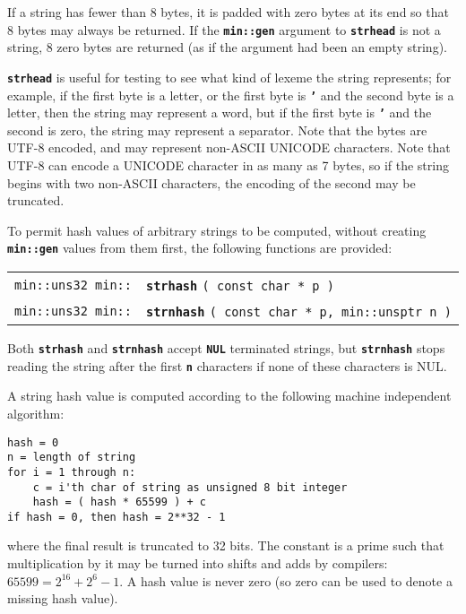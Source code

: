 \documentclass[12pt]{article}
\makeatletter
\newcommand{\TT}[1]{{\tt \bfseries #1}}
\newcommand{\ttindex}[1]{\index{#1@{\tt #1}}}
\newenvironment{indpar}[1][0.3in]%
	{\begin{list}{}%
		     {\setlength{\itemsep}{0in}%
		      \setlength{\topsep}{0in}%
		      \setlength{\parsep}{1ex}%
		      \setlength{\labelwidth}{#1}%
		      \setlength{\leftmargin}{#1}%
		      \addtolength{\leftmargin}{\labelsep}}%
	 \item}%
	{\end{list}}
\newcommand{\LABEL}[1]{\label{#1}}
\newcommand{\MINKEY}[1]%
	   {\TT{#1}\ttindex{min::#1}\ttindex{#1}}
\makeatother
\begin{document}
If a string has fewer than 8 bytes, it is padded with zero bytes
at its end so that 8 bytes may always be returned.  If the \TT{min::gen}
argument to \TT{strhead} is not a string, 8 zero bytes are returned
(as if the argument had been an empty string).

\TT{strhead} is useful for testing
to see what kind of lexeme the string represents; for
example, if the first byte is a letter, or the first byte is \TT{'}
and the second byte is a letter, then the string may represent a
word, but if the first byte is \TT{'} and the second is zero,
the string may represent a separator.
Note that the bytes are UTF-8 encoded, and may represent non-ASCII
UNICODE characters.  Note that UTF-8 can encode a UNICODE character
in as many as 7 bytes, so if the string begins with two non-ASCII
characters, the encoding of the second may be truncated.

To permit hash values of arbitrary strings to be computed,
without creating \TT{min::gen} values from them first,
the following functions are provided:

\begin{indpar}\begin{tabular}{r@{}l}
\verb|min::uns32 min::| & \MINKEY{strhash} \verb|( const char * p )|
\LABEL{MIN::STRHASH} \\
\verb|min::uns32 min::|
    & \MINKEY{strnhash} \verb|( const char * p, min::unsptr n )|
\LABEL{MIN::STRNHASH} \\
\end{tabular}\end{indpar}

Both \TT{strhash} and \TT{strnhash} accept \TT{NUL} terminated strings, but
\TT{strnhash} stops reading the string after the first \TT{n} characters
if none of these characters is NUL.

A string hash value is computed according to the following machine
independent algorithm:\label{HASH-ALGORITHM}

\begin{indpar}\begin{verbatim}
hash = 0
n = length of string
for i = 1 through n:
    c = i'th char of string as unsigned 8 bit integer
    hash = ( hash * 65599 ) + c
if hash = 0, then hash = 2**32 - 1
\end{verbatim}\end{indpar}

where the final result is truncated to 32 bits.  The constant
is a prime such that multiplication by it may be turned into
shifts and adds by compilers: $65599=2^{16}+2^6-1$.
A hash value is never zero (so zero can be used to denote a missing hash value).
\end{document}
